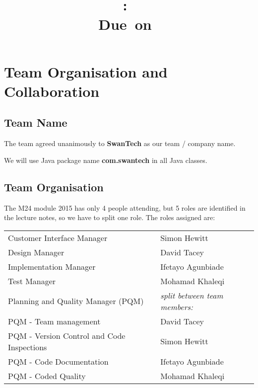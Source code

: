 \documentclass{article}
\title{
\vspace{2in}
\textmd{\textbf{\hmwkClass:\ \hmwkTitle}}\\
\normalsize\vspace{0.1in}\small{Due\ on\ \hmwkDueDate}\\
\vspace{0.1in}\large{\textit{\hmwkClassInstructor}}
\vspace{3in}
}
\author{\textbf{\hmwkAuthorName}}
\date{} %
\begin{document}
\maketitle



\newpage
\tableofcontents
\newpage
\section{Team Organisation and Collaboration}
\subsection{Team Name}
The team agreed unanimously to \textbf{SwanTech} as our team / company name.

We will use Java package name \textbf{com.swantech} in all Java classes.


\subsection{Team Organisation}
The M24 module 2015 has only 4 people attending, but 5 roles are identified in the lecture notes, so we have to split one role. The roles assigned are:\\

\begin{tabular}{ |l|l| }   %
 \hline
 Customer Interface Manager & Simon Hewitt  \\ 
 Design Manager & David Tacey  \\ 
 Implementation Manager & Ifetayo Agunbiade  \\ 
 Test Manager & Mohamad Khaleqi \\
 Planning and Quality Manager  (PQM)& \textit{split between team members:}\\
 PQM - Team management & David Tacey\\
 PQM - Version Control and Code Inspections & Simon Hewitt\\
 PQM - Code Documentation & Ifetayo Agunbiade\\
 PQM - Coded Quality & Mohamad Khaleqi \\
 \hline
\end{tabular}\\
\end{document}
